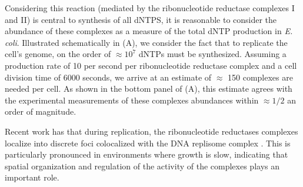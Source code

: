 Considering this reaction (mediated by the ribonucleotide reductase complexes I
and II) is central to synthesis of all dNTPS, it is reasonable to consider the
abundance of these complexes as a measure of the total dNTP production in
\textit{E. coli}. Illustrated schematically in (A), we
consider the fact that to replicate the cell's genome, on the order of $\approx
10^7$ dNTPs must be synthesized. Assuming a production rate of 10 per second per
ribonucleotide reductase complex and a cell division time of 6000 seconds, we
arrive at an estimate of $\approx$ 150 complexes are needed per cell. As shown
in the bottom panel of (A), this estimate agrees with the
experimental measurements of these complexes abundances within $\approx 1/2$ an
order of magnitude. 

Recent work has that during replication, the ribonucleotide reductases complexes
localize into discrete foci colocalized with the DNA replisome complex
\citep{sanchez-romero2011}. This is particularly pronounced in environments
where growth is slow, indicating that spatial organization and regulation of the
activity of the complexes plays an important role. 

\begin{figure} 
    \begin{fullwidth} 
\end{fullwidth} 
\end{figure}


